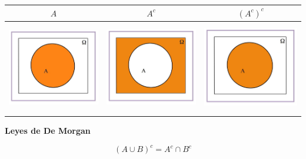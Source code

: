 \documentclass[]{book}
\begin{document}
\begin{longtable}[]{@{}ccc@{}}
\toprule
\(A\) & \(A^c\) & \((A^c)^c\)\tabularnewline
\midrule
\endhead
\includegraphics[width=\textwidth,height=4cm]{Images/proba1dibujos/dd2.jpg} & \includegraphics[width=\textwidth,height=4cm]{Images/proba1dibujos/dd1.jpg} & \includegraphics[width=\textwidth,height=4cm]{Images/proba1dibujos/dd3.jpg}\tabularnewline
\bottomrule
\end{longtable}

\textbf{Leyes de De Morgan}

\[(A\cup B)^c=A^c\cap B^c\]
\end{document}
